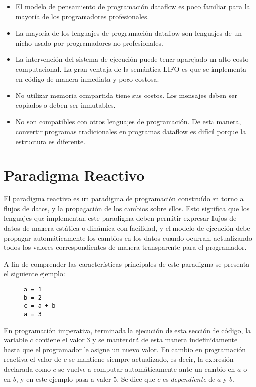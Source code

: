 \begin{itemize}
  \item El modelo de pensamiento de programación dataflow es poco familiar para
  la mayoría de los programadores profesionales.
  \item La mayoría de los lenguajes de programación dataflow son lenguajes de
  un nicho usado por programadores no profesionales.
  \item La intervención del sistema de ejecución puede tener aparejado un alto
  costo computacional. La gran ventaja de la semántica LIFO es que se implementa
  en código de manera inmediata y poco costosa.
  \item No utilizar memoria compartida tiene sus costos. Los mensajes deben ser
  copiados o deben ser inmutables.
  \item No son compatibles con otros lenguajes de programación. De esta
  manera, convertir programas tradicionales en programas dataflow es difícil
  porque la estructura es diferente.
\end{itemize}

\section{Paradigma Reactivo}

El paradigma reactivo es un paradigma de programación construído en torno a
flujos de datos, y la propagación de los cambios sobre ellos. Esto significa que
los lenguajes que implementan este paradigma deben permitir expresar flujos de
datos de manera estática o dinámica con facilidad, y el modelo de ejecución
debe propagar automáticamente los cambios en los datos cuando ocurran,
actualizando todos los valores correspondientes de manera transparente para el
programador.

A fin de comprender las características principales de este paradigma se
presenta el siguiente ejemplo:

\begin{figure}[h!]
\centering
\begin{verbatim}
a = 1
b = 2
c = a + b
a = 3
\end{verbatim}
\end{figure}

En programación imperativa, terminada la ejecución de esta sección de código,
la variable $c$ contiene el valor $3$ y se mantendrá de esta manera
indefinidamente hasta que el programador le asigne un nuevo valor. En cambio en
programación reactiva el valor de $c$ se mantiene siempre actualizado, es
decir, la expresión declarada como $c$ se vuelve a computar automáticamente
ante un cambio en $a$ o en $b$, y en este ejemplo pasa a valer $5$. Se dice que
$c$ es \textit{dependiente} de $a$ y $b$.
\cite{Bainomugisha:2013:SRP:2501654.2501666}

